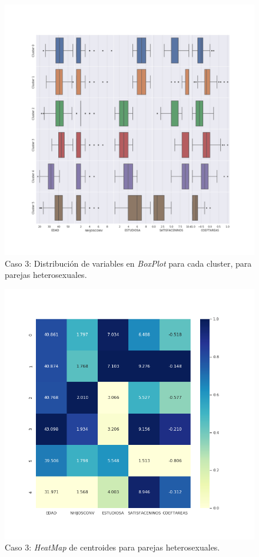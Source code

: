 \documentclass[11pt,a4paper]{article}
\begin{document}
	\begin{figure}[] 
		\centering
		\includegraphics[scale=0.3]{../Caso3/hetero/boxes}
		\caption{Caso 3: Distribución de variables en \emph{BoxPlot} para cada cluster, para parejas heterosexuales.} 
		\label{boxes3}
	\end{figure}

	\begin{figure}[] 
		\centering
		\includegraphics[scale=0.4]{../Caso3/hetero/heatmap}
		\caption{Caso 3: \emph{HeatMap} de centroides para parejas heterosexuales.} 
		\label{heatmap3}
	\end{figure}
\end{document}
